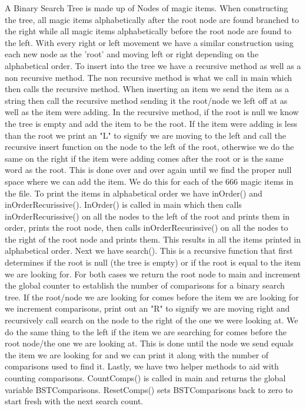 \documentclass{article}
\begin{document}
\large
A Binary Search Tree is made up of Nodes of magic items. When constructing the tree, all magic items alphabetically after the root node are found branched to the right while all magic items alphabetically before the root node are found to the left. With every right or left movement we have a similar construction using each new node as the 'root' and moving left or right depending on the alphabetical order. To insert into the tree we have a recursive method as well as a non recursive method. The non recursive method is what we call in main which then calls the recursive method. When inserting an item we send the item as a string then call the recursive method sending it the root/node we left off at as well as the item were adding. In the recursive method, if the root is null we know the tree is empty and add the item to be the root. If the item were adding is less than the root we print an "L" to signify we are moving to the left and call the recursive insert function on the node to the left of the root, otherwise we do the same on the right if the item were adding comes after the root or is the same word as the root. This is done over and over again until we find the proper null space where we can add the item. We do this for each of the 666 magic items in the file. To print the items in alphabetical order we have inOrder() and inOrderRecurissive(). InOrder() is called in main which then calls inOrderRecurissive() on all the nodes to the left of the root and prints them in order, prints the root node, then calls inOrderRecurissive() on all the nodes to the right of the root node and prints them. This results in all the items printed in alphabetical order. Next we have search(). This is a recursive function that first determines if the root is null (the tree is empty) or if the root is equal to the item we are looking for. For both cases we return the root node to main and increment the global counter to establish the number of comparisons for a binary search tree. If the root/node we are looking for comes  before the item we are looking for we increment comparisons, print out an "R" to signify we are moving right and recursively call search on the node to the right of the one we were looking at. We do the same thing to the left if the item we are searching for comes before the root node/the one we are looking at. This is done until the node we send equals the item we are looking for and we can print it along with the number of comparisons used to find it. Lastly, we have two helper methods to aid with counting comparisons. CountComps() is called in main and returns the global variable BSTComparisons. ResetComps() sets BSTComparisons  back to zero to start fresh with the next search count. 
\end{document}
